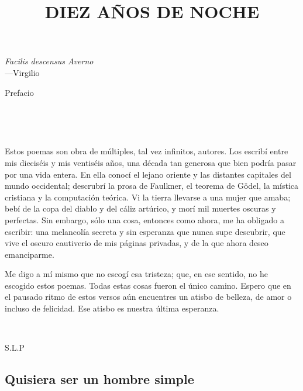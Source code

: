 \documentclass[a4paper, 12pt]{article}
\title{DIEZ AÑOS DE NOCHE}
\begin{document}
\date{}
\maketitle

\pagebreak

\hspace*{\fill}\textit{Facilis descensus Averno}\\
\hspace*{\fill}—Virgilio

\pagebreak
\tableofcontents
\pagebreak
\Huge
\centerline{Prefacio}
\normalsize

~

~ 

Estos poemas son obra de múltiples, tal vez infinitos, autores. Los escribí
entre mis dieciséis y mis ventiséis años, una década tan generosa que bien
podría pasar por una vida entera. En ella conocí el lejano oriente y las
distantes capitales del mundo occidental; descrubrí la prosa de Faulkner, el
teorema de Gödel, la mística cristiana y la computación teórica. Vi la
tierra llevarse a una mujer que amaba; bebí de la copa del diablo y del cáliz
artúrico, y morí mil muertes oscuras y perfectas. Sin embargo, sólo una cosa,
entonces como ahora, me ha obligado a escribir: una melancolía secreta y sin
esperanza que nunca supe descubrir, que vive el oscuro cautiverio de mis
páginas privadas, y de la que ahora deseo emanciparme. 

Me digo a mí mismo que no escogí esa tristeza; que, en ese sentido, no he
escogido estos poemas. Todas estas cosas fueron el único camino. Espero que en
el pausado ritmo de estos versos aún encuentres un atisbo de belleza, de amor o
incluso de felicidad. Ese atisbo es nuestra última esperanza.
~ 

~

\hspace*{\fill}S.L.P
~

\pagebreak

\subsection{Quisiera ser un hombre simple}
~
\end{document}
